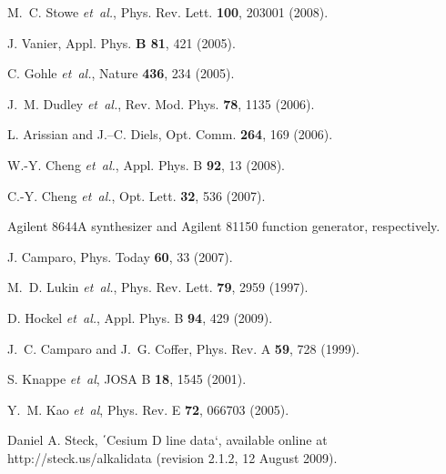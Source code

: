 \documentclass[%
reprint,  
aps,
prl,
showpacs,
]{revtex4}
\begin{document}
\begin{references}


 M.~C. Stowe {\it et~al.}, Phys. Rev. Lett. {\bf 100}, 203001 (2008).

 J. Vanier, Appl. Phys. {\bf B 81}, 421 (2005).

 C. Gohle {\it et~al.}, Nature {\bf 436}, 234 (2005).

 J.~M. Dudley {\it et~al.}, Rev. Mod. Phys. {\bf 78}, 1135 (2006).

 L. Arissian and J.–C. Diels, Opt. Comm. {\bf 264}, 169 (2006).

 W.-Y. Cheng {\it et~al.}, Appl. Phys. B {\bf 92}, 13 (2008).

 C.-Y. Cheng {\it et~al.}, Opt. Lett. {\bf 32}, 536 (2007).

 Agilent 8644A synthesizer and Agilent 81150 function generator, respectively.

 J. Camparo, Phys. Today {\bf 60}, 33 (2007).

 M.~D. Lukin {\it et~al.}, Phys. Rev. Lett. {\bf 79}, 2959 (1997).

 D. Hockel {\it et~al.}, Appl. Phys. B {\bf 94}, 429 (2009).

 J.~C. Camparo and J.~G. Coffer, Phys. Rev. A {\bf 59}, 728 (1999).

 S. Knappe {\it et~al}, JOSA B {\bf 18}, 1545 (2001).

 Y.~M. Kao {\it et~al}, Phys. Rev. E {\bf 72}, 066703 (2005).

 Daniel A. Steck, ΄Cesium D line data‘, available online at http://steck.us/alkalidata (revision 2.1.2, 12 August 2009).








\end{references}
\end{document}
